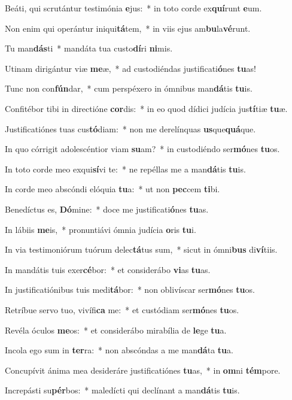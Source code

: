 \item Beáti, qui scrutántur testimónia \textbf{e}jus:~* in toto corde ex\textbf{quí}runt \textbf{e}um.
\item Non enim qui operántur iniqui\textbf{tá}tem,~* in viis ejus am\textbf{bu}la\textbf{vé}runt.
\item Tu man\textbf{dás}ti~* mandáta tua custo\textbf{dí}ri \textbf{ni}mis.
\item Utinam dirigántur viæ \textbf{me}æ,~* ad custodiéndas justificati\textbf{ó}nes \textbf{tu}as!
\item Tunc non con\textbf{fún}dar,~* cum perspéxero in ómnibus man\textbf{dá}tis \textbf{tu}is.
\item Confitébor tibi in directióne \textbf{cor}dis:~* in eo quod dídici judícia jus\textbf{tí}tiæ \textbf{tu}æ.
\item Justificatiónes tuas cus\textbf{tó}diam:~* non me derelínquas \textbf{us}que\textbf{quá}que.
\item In quo córrigit adolescéntior viam \textbf{su}am?~* in custodiéndo ser\textbf{mó}nes \textbf{tu}os.
\item In toto corde meo exqui\textbf{sí}vi te:~* ne repéllas me a man\textbf{dá}tis \textbf{tu}is.
\item In corde meo abscóndi elóquia \textbf{tu}a:~* ut non \textbf{pec}cem \textbf{ti}bi.
\item Benedíctus es, \textbf{Dó}mine:~* doce me justificati\textbf{ó}nes \textbf{tu}as.
\item In lábiis \textbf{me}is,~* pronuntiávi ómnia judícia \textbf{o}ris \textbf{tu}i.
\item In via testimoniórum tuórum delec\textbf{tá}tus sum,~* sicut in ómni\textbf{bus} di\textbf{ví}tiis.
\item In mandátis tuis exer\textbf{cé}bor:~* et considerábo \textbf{vi}as \textbf{tu}as.
\item In justificatiónibus tuis medi\textbf{tá}bor:~* non oblivíscar ser\textbf{mó}nes \textbf{tu}os.
\item Retríbue servo tuo, vivífi\textbf{ca} me:~* et custódiam ser\textbf{mó}nes \textbf{tu}os.
\item Revéla óculos \textbf{me}os:~* et considerábo mirabília de \textbf{le}ge \textbf{tu}a.
\item Incola ego sum in \textbf{ter}ra:~* non abscóndas a me man\textbf{dá}ta \textbf{tu}a.
\item Concupívit ánima mea desideráre justificatiónes \textbf{tu}as,~* in \textbf{om}ni \textbf{tém}pore.
\item Increpásti su\textbf{pér}bos:~* maledícti qui declínant a man\textbf{dá}tis \textbf{tu}is.
